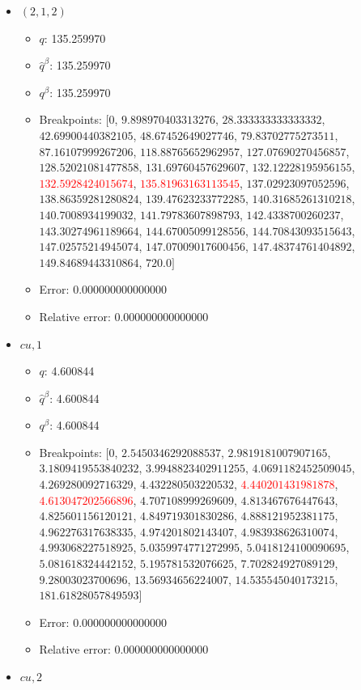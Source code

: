 \documentclass{article}%
\begin{document}
\begin{itemize}
\begin{itemize}
	\end{itemize}%
	\item $(2, 1, 2)$%
	\begin{itemize}%
		\item $q$: 135.259970%
		\item $\hat{q}^\beta$: 135.259970%
		\item $q^\beta$: 135.259970%
		\item Breakpoints: $[$$0$, $9.898970403313276$, $28.333333333333332$, $42.69900440382105$, $48.67452649027746$, $79.83702775273511$, $87.16107999267206$, $118.88765652962957$, $127.07690270456857$, $128.52021081477858$, $131.69760457629607$, $132.12228195956155$, \textcolor{red}{$132.5928424015674$}, \textcolor{red}{$135.81963163113545$}, $137.02923097052596$, $138.86359281280824$, $139.47623233772285$, $140.31685261310218$, $140.7008934199032$, $141.79783607898793$, $142.4338700260237$, $143.30274961189664$, $144.67005099128556$, $144.70843093515643$, $147.02575214945074$, $147.07009017600456$, $147.48374761404892$, $149.84689443310864$, $720.0$$]$%
		\item Error: 0.000000000000000%
		\item Relative error: 0.000000000000000%
	\end{itemize}%
	\item $\textit{cu},1$%
	\begin{itemize}%
		\item $q$: 4.600844%
		\item $\hat{q}^\beta$: 4.600844%
		\item $q^\beta$: 4.600844%
		\item Breakpoints: $[$$0$, $2.5450346292088537$, $2.9819181007907165$, $3.1809419553840232$, $3.9948823402911255$, $4.0691182452509045$, $4.269280092716329$, $4.432280503220532$, \textcolor{red}{$4.440201431981878$}, \textcolor{red}{$4.613047202566896$}, $4.707108999269609$, $4.813467676447643$, $4.825601156120121$, $4.849719301830286$, $4.888121952381175$, $4.962276317638335$, $4.974201802143407$, $4.983938626310074$, $4.993068227518925$, $5.0359974771272995$, $5.0418124100090695$, $5.081618324442152$, $5.195781532076625$, $7.702824927089129$, $9.28003023700696$, $13.56934656224007$, $14.535545040173215$, $181.61828057849593$$]$%
		\item Error: 0.000000000000000%
		\item Relative error: 0.000000000000000%
	\end{itemize}%
	\item $\textit{cu},2$%
	\begin{itemize}%

\end{itemize}
\end{itemize}
\end{document}
